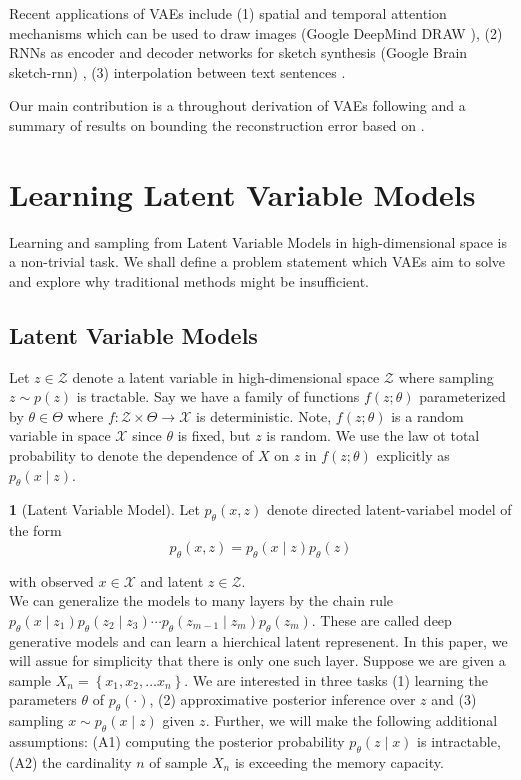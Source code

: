\documentclass[11pt]{article}
\theoremstyle{plain}
\theoremstyle{definition}
\newtheorem{defn}[thm]{\protect\definitionname}
\theoremstyle{plain}
\providecommand{\definitionname}{Definition}
\begin{document}
Recent applications of VAEs include (1) spatial and temporal attention
mechanisms which can be used to draw images (Google DeepMind DRAW
\cite{icml2015_gregor15}), (2) RNNs as encoder and decoder networks
for sketch synthesis (Google Brain sketch-rnn) \cite{DBLP:journals/corr/HaE17},
(3) interpolation between text sentences \cite{DBLP:journals/corr/BowmanVVDJB15}.

Our main contribution is a throughout derivation of VAEs following
\cite{journals/corr/KingmaW13} and a summary of results on bounding
the reconstruction error based on \cite{doersch2016tutorial}.

\section{Learning Latent Variable Models}

Learning and sampling from Latent Variable Models in high-dimensional
space is a non-trivial task. We shall define a problem statement which
VAEs aim to solve and explore why traditional methods might be insufficient.

\subsection{Latent Variable Models}

Let $z\in\mathcal{Z}$ denote a latent variable in high-dimensional
space $\mathcal{Z}$ where sampling $z\sim p(z)$ is tractable. Say
we have a family of functions $f(z;\theta)$ parameterized by $\theta\in\Theta$
where $f:\mathcal{Z}\times\Theta\rightarrow\mathcal{X}$ is deterministic.
Note, $f(z;\theta)$ is a random variable in space $\mathcal{X}$
since $\theta$ is fixed, but $z$ is random. We use the law ot total
probability to denote the dependence of $X$ on $z$ in $f(z;\theta)$
explicitly as $p_{\theta}(x\mid z)$.
\begin{defn}[Latent Variable Model]
Let $p_{\theta}(x,z)$ denote directed latent-variabel model of the
form
\begin{equation}
p_{\theta}(x,z)=p_{\theta}(x\mid z)p_{\theta}(z)
\end{equation}
\end{defn}
with observed $x\in\mathcal{X}$ and latent $z\in\mathcal{Z}$.\\

\noindent We can generalize the models to many layers by the chain
rule $p_{\theta}(x\mid z_{1})p_{\theta}(z_{2}\mid z_{3})\cdots p_{\theta}(z_{m-1}\mid z_{m})p_{\theta}(z_{m})$.
These are called deep generative models and can learn a hierchical
latent represenent. In this paper, we will assue for simplicity that
there is only one such layer. Suppose we are given a sample $X_{n}=\left\{ x_{1},x_{2},\ldots x_{n}\right\} $.
We are interested in three tasks (1) learning the parameters $\theta$
of $p_{\theta}(\cdot)$, (2) approximative posterior inference over
$z$ and (3) sampling $x\sim p_{\theta}(x\mid z)$ given $z$. Further,
we will make the following additional assumptions: (A1) computing
the posterior probability $p_{\theta}(z\mid x)$ is intractable, (A2)
the cardinality $n$ of sample $X_{n}$ is exceeding the memory capacity.
\end{document}
